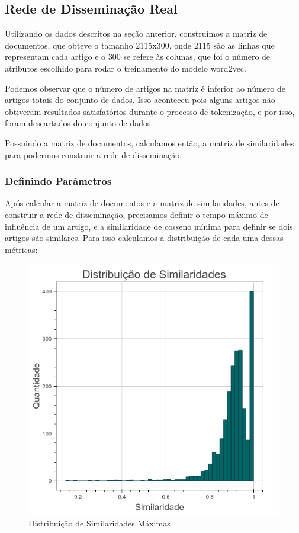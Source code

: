 \documentclass[a4paper,12pt]{article}
\begin{document}
\subsection{Rede de Disseminação Real}

Utilizando os dados descritos na seção anterior, construímos a matriz de documentos, que obteve o tamanho 2115x300, onde 2115 são as linhas
que representam cada artigo e o 300 se refere às colunas, que foi o número de atributos escolhido para rodar o treinamento do 
modelo word2vec.

Podemos observar que o número de artigos na matriz é inferior ao número de artigos totais do conjunto de dados. Isso aconteceu pois 
alguns artigos não obtiveram resultados satisfatórios durante o processo de tokenização, e por isso, foram descartados do conjunto de dados.

Possuindo a matriz de documentos, calculamos então, a matriz de similaridades para podermos construir a rede de disseminação.

\pagebreak
\subsubsection{Definindo Parâmetros}

Após calcular a matriz de documentos e a matriz de similaridades, antes de construir a rede de disseminação,
precisamos definir o tempo máximo de influência de um artigo, e a similaridade de cosseno
mínima para definir se dois artigos são similares. Para isso calculamos a distribuição de cada uma dessas métricas:

\begin{figure}[ht]
 \centering
 \includegraphics[scale=0.6]{./2.png}
 \caption{Distribuição de Similaridades Máximas}
\end{figure}
\end{document}

